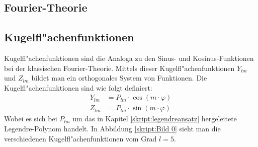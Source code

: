 \begin{refsection}
\section{Fourier-Theorie}

\subsection{Kugelfl"achenfunktionen}
Kugelfl"achenfunktionen sind die Analoga zu den Sinus- und 
Kosinus-Funktionen bei der klassischen Fourier-Theorie. 
Mittels dieser Kugelfl"achenfunktionen $Y_{lm}$ und $Z_{lm}$ 
bildet man ein orthogonales System von Funktionen. 
Die Kugelfl"achenfunktionen sind wie folgt definiert:
\begin{align*}
Y_{lm}& = P_{lm} \cdot \cos(m \cdot \varphi)
\\
Z_{lm}& = P_{lm} \cdot \sin(m \cdot \varphi)
\end{align*}
Wobei es sich bei $P_{lm}$ um das in Kapitel \ref{skript:legendreansatz} 
hergeleitete Legendre-Polynom handelt. 
In Abbildung \ref{skript:Bild 0} sieht man die verschiedenen 
Kugelfl"achenfunktionen vom Grad $l = 5$.


\end{refsection}
